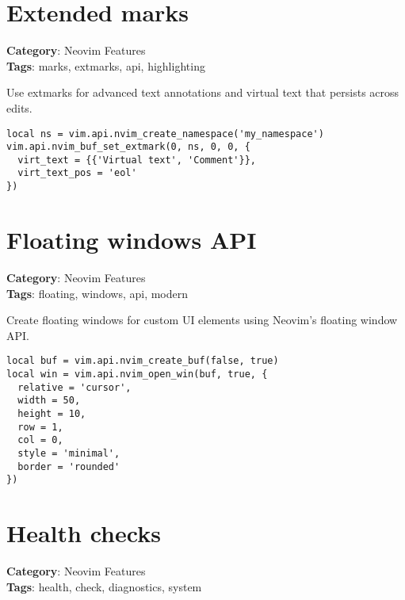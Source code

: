 {{{{{{{{{\section{Extended marks}

\textbf{Category}: Neovim Features\\ \textbf{Tags}: marks, extmarks, api, highlighting
\vspace{0.5cm}

Use extmarks for advanced text annotations and virtual text that persists across edits.

\begin{Exa*}{}
\begin{Verbatim}[fontsize=\footnotesize, breaklines, breakanywhere]
local ns = vim.api.nvim_create_namespace('my_namespace')
vim.api.nvim_buf_set_extmark(0, ns, 0, 0, {
  virt_text = {{'Virtual text', 'Comment'}},
  virt_text_pos = 'eol'
})
\end{Verbatim}
\end{Exa*}

\section{Floating windows API}

\textbf{Category}: Neovim Features\\ \textbf{Tags}: floating, windows, api, modern
\vspace{0.5cm}

Create floating windows for custom UI elements using Neovim's floating window API.

\begin{Exa*}{}
\begin{Verbatim}[fontsize=\footnotesize, breaklines, breakanywhere]
local buf = vim.api.nvim_create_buf(false, true)
local win = vim.api.nvim_open_win(buf, true, {
  relative = 'cursor',
  width = 50,
  height = 10,
  row = 1,
  col = 0,
  style = 'minimal',
  border = 'rounded'
})
\end{Verbatim}
\end{Exa*}

\section{Health checks}

\textbf{Category}: Neovim Features\\ \textbf{Tags}: health, check, diagnostics, system
\vspace{0.5cm}

}}}}}}}}}
